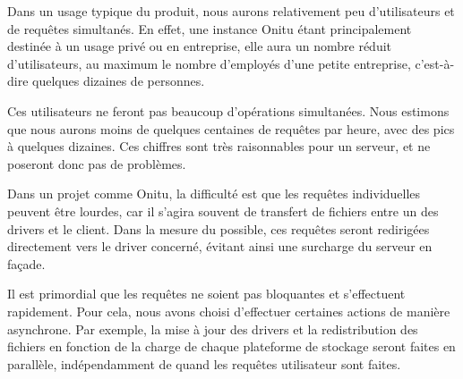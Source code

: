 Dans un usage typique du produit, nous aurons relativement peu d'utilisateurs et de requêtes simultanés. En effet, une instance Onitu étant principalement destinée à un usage privé ou en entreprise, elle aura un nombre réduit d'utilisateurs, au maximum le nombre d'employés d'une petite entreprise, c'est-à-dire quelques dizaines de personnes.

Ces utilisateurs ne feront pas beaucoup d'opérations simultanées. Nous estimons que nous aurons moins de quelques centaines de requêtes par heure, avec des pics à quelques dizaines. Ces chiffres sont très raisonnables pour un serveur, et ne poseront donc pas de problèmes.

Dans un projet comme Onitu, la difficulté est que les requêtes individuelles peuvent être lourdes, car il s'agira souvent de transfert de fichiers entre un des drivers et le client. Dans la mesure du possible, ces requêtes seront redirigées directement vers le driver concerné, évitant ainsi une surcharge du serveur en façade.

Il est primordial que les requêtes ne soient pas bloquantes et s'effectuent rapidement. Pour cela, nous avons choisi d'effectuer certaines actions de manière asynchrone. Par exemple, la mise à jour des drivers et la redistribution des fichiers en fonction de la charge de chaque plateforme de stockage seront faites en parallèle, indépendamment de quand les requêtes utilisateur sont faites.


